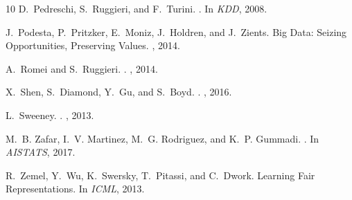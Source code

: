 \documentclass[letterpaper]{sig-alternate-2013}
\begin{document}
\begin{thebibliography}{10}
D.~Pedreschi, S.~Ruggieri, and F.~Turini.
.
\newblock In {\em {KDD}}, 2008.

J.~Podesta, P.~Pritzker, E.~Moniz, J.~Holdren, and J.~Zients.
\newblock Big {D}ata: {S}eizing {O}pportunities, {P}reserving {V}alues.
, 2014.

A.~Romei and S.~Ruggieri.
.
, 2014.

X.~Shen, S.~Diamond, Y.~Gu, and S.~Boyd.
.
, 2016.

L.~Sweeney.
.
, 2013.

M.~B. Zafar, I.~V. Martinez, M.~G. Rodriguez, and K.~P. Gummadi.
.
\newblock In {\em {AISTATS}}, 2017.

R.~Zemel, Y.~Wu, K.~Swersky, T.~Pitassi, and C.~Dwork.
\newblock Learning {F}air {R}epresentations.
\newblock In {\em ICML}, 2013.

\end{thebibliography}
\end{document}
